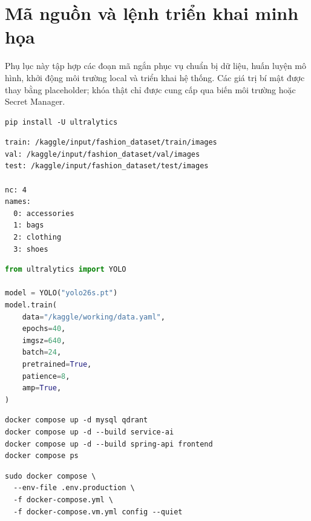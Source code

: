 
\section{Mã nguồn và lệnh triển khai minh họa}
\label{source-code}

Phụ lục này tập hợp các đoạn mã ngắn phục vụ chuẩn bị dữ liệu, huấn luyện mô hình,
khởi động môi trường local và triển khai hệ thống. Các giá trị bí mật được thay bằng
placeholder; khóa thật chỉ được cung cấp qua biến môi trường hoặc Secret Manager.

\begin{lstlisting}[style=terminal,caption={Cài đặt thư viện phục vụ fine-tune YOLOv26},label={lst:appendix-install-ultralytics}]
pip install -U ultralytics
\end{lstlisting}

\begin{lstlisting}[style=terminal,caption={Cấu hình tập dữ liệu YOLO},label={lst:appendix-yolo-data}]
train: /kaggle/input/fashion_dataset/train/images
val: /kaggle/input/fashion_dataset/val/images
test: /kaggle/input/fashion_dataset/test/images

nc: 4
names:
  0: accessories
  1: bags
  2: clothing
  3: shoes
\end{lstlisting}

\begin{lstlisting}[language=Python,caption={Huấn luyện mô hình YOLOv26s},label={lst:appendix-yolo-train}]
from ultralytics import YOLO

model = YOLO("yolo26s.pt")
model.train(
    data="/kaggle/working/data.yaml",
    epochs=40,
    imgsz=640,
    batch=24,
    pretrained=True,
    patience=8,
    amp=True,
)
\end{lstlisting}

\begin{lstlisting}[style=terminal,caption={Khởi động môi trường local bằng Docker Compose},label={lst:appendix-local-compose}]
docker compose up -d mysql qdrant
docker compose up -d --build service-ai
docker compose up -d --build spring-api frontend
docker compose ps
\end{lstlisting}

\begin{lstlisting}[style=terminal,caption={Kiểm tra cấu hình trước khi triển khai trên GCE VM},label={lst:appendix-gce-config}]
sudo docker compose \
  --env-file .env.production \
  -f docker-compose.yml \
  -f docker-compose.vm.yml config --quiet
\end{lstlisting}

